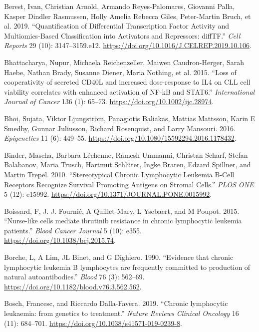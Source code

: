 \documentclass[11pt, a4paper, twosided]{book}
\newenvironment{CSLReferences}%
  {}%
  {\par}
\begin{document}
\begin{CSLReferences}{1}{0}
\leavevmode{}%
Berest, Ivan, Christian Arnold, Armando Reyes-Palomares, Giovanni Palla, Kasper Dindler Rasmussen, Holly Amelia Rebecca Giles, Peter-Martin Bruch, et al. 2019. {``{Quantification of Differential Transcription Factor Activity and Multiomics-Based Classification into Activators and Repressors: diffTF}.''} \emph{Cell Reports} 29 (10): 3147--3159.e12. \url{https://doi.org/10.1016/J.CELREP.2019.10.106}.

\leavevmode{}%
Bhattacharya, Nupur, Michaela Reichenzeller, Maiwen Caudron-Herger, Sarah Haebe, Nathan Brady, Susanne Diener, Maria Nothing, et al. 2015. {``{Loss of cooperativity of secreted CD40L and increased dose-response to IL4 on CLL cell viability correlates with enhanced activation of NF-kB and STAT6}.''} \emph{International Journal of Cancer} 136 (1): 65--73. \url{https://doi.org/10.1002/ijc.28974}.

\leavevmode{}%
Bhoi, Sujata, Viktor Ljungström, Panagiotis Baliakas, Mattias Mattsson, Karin E Smedby, Gunnar Juliusson, Richard Rosenquist, and Larry Mansouri. 2016. \emph{Epigenetics} 11 (6): 449--55. \url{https://doi.org/10.1080/15592294.2016.1178432}.

\leavevmode{}%
Binder, Mascha, Barbara Léchenne, Ramesh Ummanni, Christan Scharf, Stefan Balabanov, Maria Trusch, Hartmut Schlüter, Ingke Braren, Edzard Spillner, and Martin Trepel. 2010. {``{Stereotypical Chronic Lymphocytic Leukemia B-Cell Receptors Recognize Survival Promoting Antigens on Stromal Cells}.''} \emph{PLOS ONE} 5 (12): e15992. \url{https://doi.org/10.1371/JOURNAL.PONE.0015992}.

\leavevmode{}%
Boissard, F, J. J. Fournié, A Quillet-Mary, L Ysebaert, and M Poupot. 2015. {``{Nurse-like cells mediate ibrutinib resistance in chronic lymphocytic leukemia patients}.''} \emph{Blood Cancer Journal} 5 (10): e355. \url{https://doi.org/10.1038/bcj.2015.74}.

\leavevmode{}%
Borche, L, A Lim, JL Binet, and G Dighiero. 1990. {``{Evidence that chronic lymphocytic leukemia B lymphocytes are frequently committed to production of natural autoantibodies}.''} \emph{Blood} 76 (3): 562--69. \url{https://doi.org/10.1182/blood.v76.3.562.562}.

\leavevmode{}%
Bosch, Francesc, and Riccardo Dalla-Favera. 2019. {``{Chronic lymphocytic leukaemia: from genetics to treatment}.''} \emph{Nature Reviews Clinical Oncology} 16 (11): 684--701. \url{https://doi.org/10.1038/s41571-019-0239-8}.


\end{CSLReferences}
\end{document}
